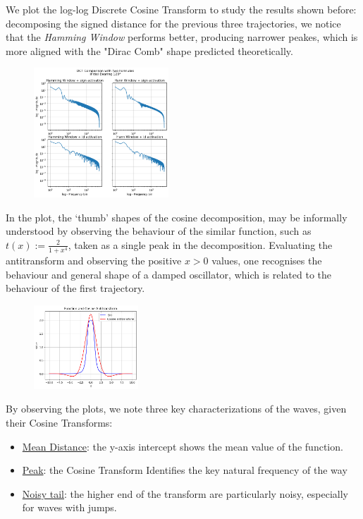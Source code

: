 \documentclass[10pt, twocolumn]{article}
\begin{document}
        We plot the log-log Discrete Cosine Transform to study the results shown before: decomposing the signed distance for the previous three trajectories, we notice that the \textit{Hamming Window} performs better, producing narrower peakes, which is more aligned with the "Dirac Comb" shape predicted theoretically.
        \begin{figure}[H]
          \centering
          \includegraphics[width=0.45\textwidth]{figures/dct_120_loglog.png}
          \label{fig:dct1}
        \end{figure}

        In the plot, the `thumb' shapes of the cosine decomposition, may be informally understood by observing the behaviour of the similar function, such as $t(x) := \frac{2}{1+x^4}$, taken as a single peak in the decomposition. Evaluating the antitransform and observing the positive $x>0$ values, one recognises the behaviour and general shape of a damped oscillator, which is related to the behaviour of the first trajectory.

        \begin{figure}[H]
          \centering
          \includegraphics[width=0.35\textwidth]{figures/f_and_cos_antitr.png}
          \label{fig:antitransform}
        \end{figure}

        By observing the plots, we note three key characterizations of the waves, given their Cosine Transforms:
        \begin{itemize}
          \item \underline{Mean Distance}: the y-axis intercept shows the mean value of the function.
          \item \underline{Peak}: the Cosine Transform Identifies the key natural frequency of the way
          \item \underline{Noisy tail}: the higher end of the transform are particularly noisy, especially for waves with jumps.
        \end{itemize}
\end{document}
